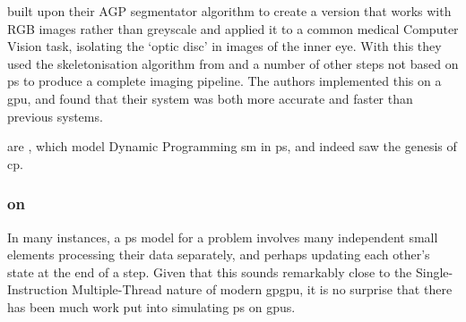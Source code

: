 \citeauthor{Diaz-Pernil2016} \cite{Diaz-Pernil2016} built upon their AGP segmentator algorithm to create a version that works with RGB images rather than greyscale and applied it to a common medical Computer Vision task, isolating the `optic disc' in images of the inner eye.  With this they used the skeletonisation algorithm from \cite{Diaz-Pernil2013a} and a number of other steps not based on \gls{ps} to produce a complete imaging pipeline.  The authors implemented this on a \gls{gpu}, and found that their system was both more accurate and faster than previous systems.

 are \cite{GimelFarb2013a,Gimelfarb2011,Nicolescu2014b}, which model Dynamic Programming \gls{sm} in \gls{ps}, and indeed saw the genesis of \gls{cp}.

\subsubsection{ on }
In many instances, a \gls{ps} model for a problem involves many independent small elements processing their data separately, and perhaps updating each other's state at the end of a step.  Given that this sounds remarkably close to the Single-Instruction Multiple-Thread \cite[Ch. 4.4.1]{Hennessy2012} nature of modern \gls{gpgpu}, it is no surprise that there has been much work put into simulating \gls{ps} on \glspl{gpu}.

